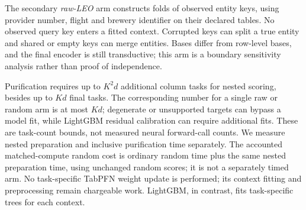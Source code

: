 The secondary \emph{raw-LEO} arm constructs folds of observed entity keys,
using provider number, flight and brewery identifier on their declared tables.
No observed query key enters a fitted context. Corrupted keys can split a true
entity and shared or empty keys can merge entities. Bases differ from row-level
bases, and the final encoder is still transductive; this arm is a boundary
sensitivity analysis rather than proof of independence.

Purification requires up to $K^2d$ additional column tasks for nested scoring,
besides up to $Kd$ final tasks. The corresponding number for a single raw or
random arm is at most $Kd$; degenerate or unsupported targets can bypass a model
fit, while LightGBM residual calibration can require additional fits.
These are task-count bounds, not measured neural forward-call counts.
We measure nested preparation and inclusive purification time separately.
The accounted matched-compute random cost is ordinary random time plus the
same nested preparation time, using unchanged random scores; it is not a separately
timed arm. No task-specific TabPFN weight
update is performed; its context fitting and preprocessing remain chargeable
work. LightGBM, in contrast, fits task-specific trees for each context.
